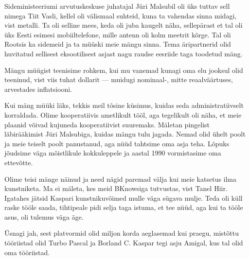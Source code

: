 Sideministeeriumi arvutuskeskuse juhatajal Jüri Malsubil oli üks tuttav 
sell nimega Tiit Vasli, kellel oli välismaal suhteid, 
kuna ta vahendas sinna midagi, vist metalli. Ta oli selline mees, keda oli juba kaugelt näha, sellepärast et tal oli 
üks Eesti esimesi mobiiltelefone, mille antenn oli kolm meetrit kõrge. 
Tal oli Rootsis ka sidemeid 
ja ta müüski meie mängu sinna. Tema äripartnerid 
olid huvitatud sellisest eksootilisest asjast nagu raudse eesriide taga 
toodetud mäng. 

Mängu müügist teenisime rohkem, kui mu vanemad kunagi oma 
elu jooksul olid teeninud, vist viis tuhat dollarit --- muidugi nominaal-, mitte reaalväärtuses, arvestades 
inflatsiooni. 

Kui mäng müüki läks, tekkis meil tõsine küsimus, kuidas seda administratiivselt 
korraldada. Olime kooperatiivis ametlikult tööl, aga tegelikult oli
näha, et meie plaanid võivad kujuneda kooperatiivist suuremaks. Mäletan pingelist läbirääkimist Jüri Malsubiga, 
kuidas mängu tulu jagada. Nemad olid ühelt poolt ja meie 
teiselt poolt panustanud, aga nüüd tahtsime oma asja teha. Lõpuks jõudsime 
väga mõistlikule kokkuleppele ja aastal 1990 vormistasime oma ettevõtte. 


Olime teisi mänge näinud ja need nägid paremad välja kui 
meie katsetus ilma kunstniketa. Ma ei mäleta, kes meid 
BKnowsiga tutvustas, vist Tanel 
Hiir. Igatahes jätsid Kaspari kunstnikuvõimed 
mulle väga sügava mulje. Teda oli küll raske tööle saada, tihtipeale 
pidi selja taga istuma, et tee nüüd, aga kui ta tööle asus, oli tulemus väga 
äge. 


Üsnagi jah, sest platvormid olid miljon korda aeglasemad kui 
praegu, mistõttu tööriistad olid Turbo Pascal ja 
Borland C. Kaspar tegi asju Amigal, kus tal olid oma 
tööriistad.


